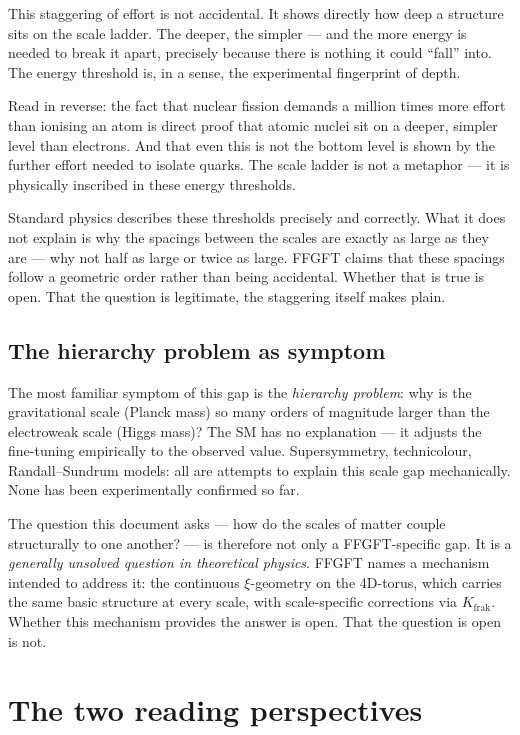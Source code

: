 This staggering of effort is not accidental. It shows directly how
deep a structure sits on the scale ladder. The deeper, the simpler ---
and the more energy is needed to break it apart, precisely because
there is nothing it could ``fall'' into. The energy threshold is, in
a sense, the experimental fingerprint of depth.

Read in reverse: the fact that nuclear fission demands a million times
more effort than ionising an atom is direct proof that atomic nuclei
sit on a deeper, simpler level than electrons. And that even this is
not the bottom level is shown by the further effort needed to isolate
quarks. The scale ladder is not a metaphor --- it is physically
inscribed in these energy thresholds.

Standard physics describes these thresholds precisely and correctly.
What it does not explain is why the spacings between the scales are
exactly as large as they are --- why not half as large or twice as
large. FFGFT claims that these spacings follow a geometric order
rather than being accidental. Whether that is true is open. That the
question is legitimate, the staggering itself makes plain.

\subsection*{The hierarchy problem as symptom}

The most familiar symptom of this gap is the \emph{hierarchy problem}:
why is the gravitational scale (Planck mass) so many orders of
magnitude larger than the electroweak scale (Higgs mass)? The SM has
no explanation --- it adjusts the fine-tuning empirically to the
observed value. Supersymmetry, technicolour, Randall--Sundrum models:
all are attempts to explain this scale gap mechanically. None has been
experimentally confirmed so far.

The question this document asks --- how do the scales of matter couple
structurally to one another? --- is therefore not only a
FFGFT-specific gap. It is a \emph{generally unsolved question in
theoretical physics}. FFGFT names a mechanism intended to address it:
the continuous $\xi$-geometry on the 4D-torus, which carries the same
basic structure at every scale, with scale-specific corrections via
$K_{\mathrm{frak}}$. Whether this mechanism provides the answer is
open. That the question is open is not.

\section{The two reading perspectives}

